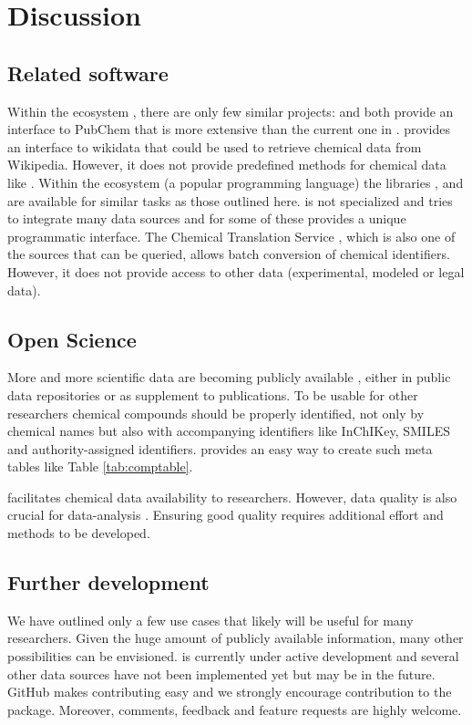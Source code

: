 \documentclass[article, shortnames]{jss}\usepackage[]{graphicx}\usepackage[]{color}
\begin{document}
\section[Discussion]{Discussion}
\subsection[Related software]{Related software}
Within the  ecosystem , there are only few similar projects:
 \citep{rpubchem_2014} and  \citep{chemminer_2008} both provide an interface to PubChem that is more extensive than the current one in .
 \citep{wikidatar_2016} provides an interface to wikidata that could be used to retrieve chemical data from Wikipedia.
However, it does not provide predefined methods for chemical data like .
Within the  ecosystem (a popular programming language) the libraries  \citep{pubchempy},  \citep{chemspipy} and  \citep{cirpy} are available for similar tasks as those outlined here.
 is not specialized and tries to integrate many data sources and for some of these provides a unique programmatic interface.
The Chemical Translation Service \citep{Wohlgemuth_Haldiya_Willighagen_Kind_Fiehn_2010}, which is also one of the sources that can be queried,  allows batch conversion of chemical identifiers.
However, it does not provide access to other data (experimental, modeled or legal data).


\subsection[Open Science]{Open Science}
More and more scientific data are becoming publicly available \citep{Gewin_2016, Reichman_Jones_Schildhauer_2011,Boyle_Guha_2011}, either in public data repositories or as supplement to publications.
To be usable for other researchers chemical compounds should be properly identified, not only by chemical names but also with accompanying identifiers like InChIKey, SMILES and authority-assigned identifiers.
 provides an easy way to create such meta tables like Table \ref{tab:comptable}.

 facilitates chemical data availability to researchers.
However, data quality is also crucial for data-analysis \citep{Stieger_2014}. 
Ensuring good quality requires additional effort and methods to be developed.


\subsection[Further development]{Further development}
We have outlined only a few use cases that likely will be useful for many researchers.
Given the huge amount of publicly available information, many other possibilities can be envisioned.
 is currently under active development and several other data sources have not been implemented yet but may be in the future.
GitHub makes contributing easy and we strongly encourage contribution to the package.
Moreover, comments, feedback and feature requests are highly welcome.
\end{document}
